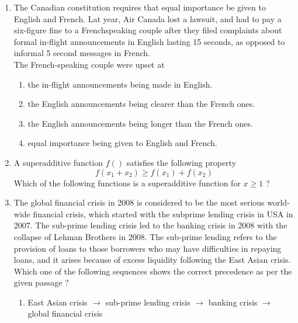 \documentclass[journal]{IEEEtran}
\begin{document}
\begin{enumerate}
	\item The Canadian constitution requires that equal importance be given to English and French. Lat year, Air Canada lost a lawsuit, and had to pay a six-figure fine to a Frenchspeaking couple after they filed complaints about formal in-flight announcements in English lasting 15 seconds, as opposed to informal 5 second messages in French. \\
		The French-speaking couple were upset at
		\begin{enumerate}
			\item the in-flight announcements being made in English.
			\item the English announcements being clearer than the French ones.
			\item the English announcements being longer than the French ones.
			\item equal importance being given to English and French.
		\end{enumerate}
	\item A superadditive function $f( )$ satisfies the following property
		$$ f(x_1 + x_2) \geq f(x_1) + f(x_2) $$
		Which of the following functions is a superadditive function for $x \geq 1$ ?
		\begin{enumerate}
		\end{enumerate}
	\item The global financial crisis in 2008 is considered to be the most serious world-wide financial crisis, which started with the subprime lending crisis in USA in 2007. The sub-prime lending crisis led to the banking crisis in 2008 with the collapse of Lehman Brothers in 2008. The sub-prime lending refers to the provision of loans to those borrowers who may have difficulties in repaying loans, and it arises because of excess liquidity following the East Asian crisis. \\
		Which one of the following sequences shows the correct precedence as per the given passage ?
		\begin{enumerate}
			\item East Asian crisis $\rightarrow$ sub-prime lending crisis $\rightarrow$ banking crisis $\rightarrow$ global financial crisis

\end{enumerate}
\end{enumerate}
\end{document}
